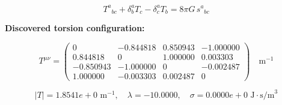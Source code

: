 
\begin{equation}
  T^a{}_{bc} + \delta^a_b T_c - \delta^a_c T_b = 8\pi G \, s^a{}_{bc}
\end{equation}

\textbf{Discovered torsion configuration:}

\begin{equation}
  T^{\mu\nu} = \begin{pmatrix}
    0 & -0.844818 & 0.850943 & -1.000000 \\
    0.844818 & 0 & 1.000000 & 0.003303 \\
    -0.850943 & -1.000000 & 0 & -0.002487 \\
    1.000000 & -0.003303 & 0.002487 & 0
  \end{pmatrix} \quad \text{m}^{-1}
\end{equation}

\begin{equation}
  |T| = 1.8541e+0 \text{ m}^{-1}, \quad
  \lambda = -10.0000, \quad
  \sigma = 0.0000e+0 \text{ J}\cdot\text{s/m}^3
\end{equation}